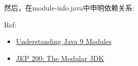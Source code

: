 \documentclass[12pt]{article}
\begin{document}
然后，在module-info.java中申明依赖关系:

\begin{Shaded}
\begin{Highlighting}[]
 \OperatorTok{\{}
\OperatorTok{;}
\OperatorTok{;}
\OperatorTok{\}}
\end{Highlighting}
\end{Shaded}

Ref:

\begin{itemize}
\tightlist
\item
  \href{https://www.oracle.com/hk/corporate/features/understanding-java-9-modules.html}{Understanding Java 9 Modules}
\item
  \href{https://openjdk.java.net/jeps/200}{JEP 200: The Modular JDK}
\end{itemize}
\end{document}
